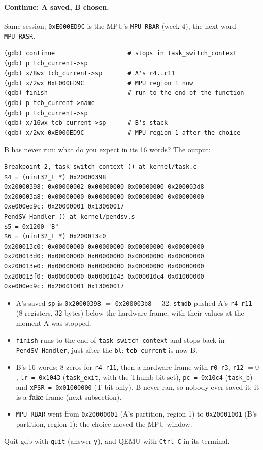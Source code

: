 \paragraph{Continue: A saved, B chosen.} Same session; \texttt{0xE000ED9C} is the MPU's \texttt{MPU\_RBAR} (week 4), the next word \texttt{MPU\_RASR}.
\begin{lstlisting}
(gdb) continue                    # stops in task_switch_context
(gdb) p tcb_current->sp
(gdb) x/8wx tcb_current->sp       # A's r4..r11
(gdb) x/2wx 0xE000ED9C            # MPU region 1 now
(gdb) finish                      # run to the end of the function
(gdb) p tcb_current->name
(gdb) p tcb_current->sp
(gdb) x/16wx tcb_current->sp      # B's stack
(gdb) x/2wx 0xE000ED9C            # MPU region 1 after the choice
\end{lstlisting}
B has never run: what do you expect in its 16 words? The output:
\begin{lstlisting}
Breakpoint 2, task_switch_context () at kernel/task.c
$4 = (uint32_t *) 0x20000398
0x20000398: 0x00000002 0x00000000 0x00000000 0x200003d8
0x200003a8: 0x00000000 0x00000000 0x00000000 0x00000000
0xe000ed9c: 0x20000001 0x13060017
PendSV_Handler () at kernel/pendsv.s
$5 = 0x1200 "B"
$6 = (uint32_t *) 0x200013c0
0x200013c0: 0x00000000 0x00000000 0x00000000 0x00000000
0x200013d0: 0x00000000 0x00000000 0x00000000 0x00000000
0x200013e0: 0x00000000 0x00000000 0x00000000 0x00000000
0x200013f0: 0x00000000 0x00001043 0x000010c4 0x01000000
0xe000ed9c: 0x20001001 0x13060017
\end{lstlisting}
\begin{itemize}
    \item A's saved \texttt{sp} is \texttt{0x20000398} $=$ \texttt{0x200003b8} $-$ 32: \texttt{stmdb} pushed A's \texttt{r4}--\texttt{r11} (8 registers, 32 bytes) below the hardware frame, with their values at the moment A was stopped.
    \item \texttt{finish} runs to the end of \texttt{task\_switch\_context} and stops back in \texttt{PendSV\_Handler}, just after the \texttt{bl}: \texttt{tcb\_current} is now B.
    \item B's 16 words: 8 zeros for \texttt{r4}--\texttt{r11}, then a hardware frame with \texttt{r0}--\texttt{r3}, \texttt{r12} $= 0$, \texttt{lr = 0x1043} (\texttt{task\_exit}, with the Thumb bit set), \texttt{pc = 0x10c4} (\texttt{task\_b}) and \texttt{xPSR = 0x01000000} (T bit only). B never ran, so nobody ever saved it: it is a \textbf{fake} frame (next subsection).
    \item \texttt{MPU\_RBAR} went from \texttt{0x20000001} (A's partition, region 1) to \texttt{0x20001001} (B's partition, region 1): the choice moved the MPU window.
\end{itemize}
Quit gdb with \texttt{quit} (answer \texttt{y}), and QEMU with \texttt{Ctrl-C} in its terminal.

